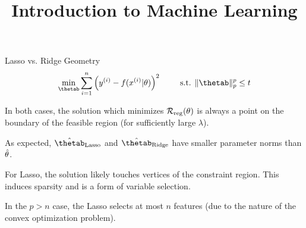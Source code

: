 



\newcommand{\titlefigure}{figure_man/l1_l2_hat.png}
\newcommand{\learninggoals}{
  \item \textcolor{blue}{XXX}
  \item \textcolor{blue}{XXX}
}

\title{Introduction to Machine Learning}
\date{}


 

\begin{vbframe}{Lasso vs. Ridge Geometry}
$$ 
  \min_{\thetab} \sumin \left(\yi - \fxit\right)^2 \qquad \text{ s.t. } \|\thetab\|_p^p  \leq t 
$$ 
  \vspace{-0.5cm}
  \begin{figure}
    \centering
  \end{figure}

  \begin{itemize}
    \item \small{In both cases, the solution which minimizes $\mathcal{R}_{\text{reg}}(\theta)$ is always a point on the boundary of the feasible region (for sufficiently large $\lambda$).
    \item As expected, $\hat{\thetab}_{\text{Lasso}}$ and $\hat{\thetab}_{\text{Ridge}}$ have smaller parameter norms than $\hat{\theta}$.}
    \item For Lasso, the solution likely touches vertices of the constraint region. This induces sparsity and is a form of variable selection.
    \item In the $p>n$ case, the Lasso selects at most $n$ features (due to the nature of the convex optimization problem).
    
  \end{itemize}
  
\end{vbframe}

